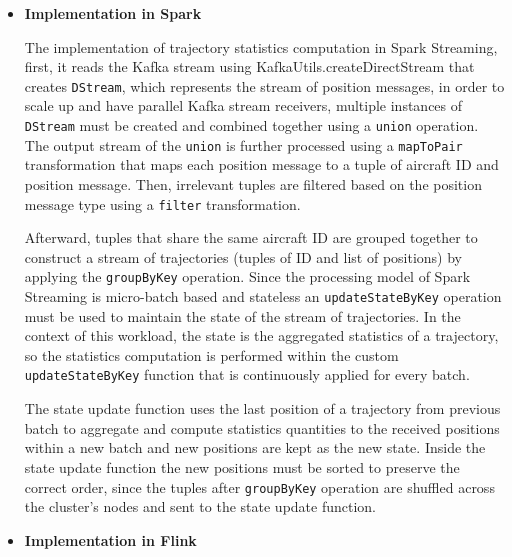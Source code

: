 \documentclass[]{article}
\begin{document}
\begin{itemize}
\item {\bf{Implementation in Spark }}

\par The implementation of trajectory statistics computation in Spark Streaming, first, it reads the Kafka stream using KafkaUtils.createDirectStream that creates \texttt{DStream}, which represents the stream of position messages, in order to scale up and have parallel Kafka stream receivers, multiple instances of \texttt{DStream} must be created and combined together using a \texttt{union} operation. The output stream of the \texttt{union} is further processed using a \texttt{mapToPair} transformation that  maps each position message to a tuple of aircraft ID and position message. Then,  irrelevant tuples are filtered based on the position message type using  a \texttt{filter} transformation.\par Afterward, tuples that share the same aircraft ID are grouped together to construct a stream of trajectories (tuples of ID and list of positions) by applying the \texttt{groupByKey} operation. Since the processing  model of Spark Streaming is micro-batch based and stateless an \texttt{updateStateByKey} operation must be used to maintain the state of the stream of trajectories. In the context of this workload, the state is the aggregated statistics of a trajectory, so the statistics computation is performed within the custom \texttt{updateStateByKey} function that is continuously applied for every batch.
 \par The state update function uses the last position of a trajectory from previous batch to aggregate and compute statistics quantities to the received positions within a new batch and new positions are kept as the new state. Inside the state update function  the new positions must be sorted to preserve the correct order, since the tuples after \texttt{groupByKey} operation are shuffled across the cluster's  nodes and sent to the state update function.

\item {\bf{Implementation in Flink }}



\end{itemize}
\end{document}
